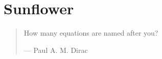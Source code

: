 \chapter{Sunflower}
\begin{quote}
  How many equations are named after you?\par
  \hfill--- Paul A. M. Dirac
\end{quote}

\lipsum[1-11]